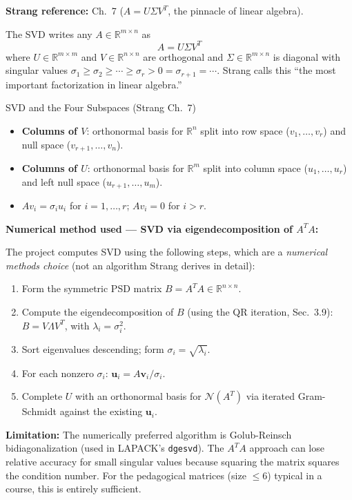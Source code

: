 \documentclass[12pt, a4paper]{article}
\newcommand{\R}{\mathbb{R}}
\newcommand{\Null}{\mathcal{N}}
\begin{document}
\textbf{Strang reference:} Ch.\ 7 ($A = U\Sigma V^T$, the pinnacle of linear
algebra).

The SVD writes any $A \in \R^{m \times n}$ as
\[
  A = U \Sigma V^T
\]
where $U \in \R^{m \times m}$ and $V \in \R^{n \times n}$ are orthogonal and
$\Sigma \in \R^{m \times n}$ is diagonal with singular values
$\sigma_1 \geq \sigma_2 \geq \cdots \geq \sigma_r > 0 = \sigma_{r+1} = \cdots$.
Strang calls this ``the most important factorization in linear algebra.''

\begin{strangbox}{SVD and the Four Subspaces (Strang Ch.\ 7)}
\begin{itemize}[noitemsep]
  \item \textbf{Columns of $V$}: orthonormal basis for $\R^n$ split into
        row space ($v_1,\ldots,v_r$) and null space ($v_{r+1},\ldots,v_n$).
  \item \textbf{Columns of $U$}: orthonormal basis for $\R^m$ split into
        column space ($u_1,\ldots,u_r$) and left null space ($u_{r+1},\ldots,u_m$).
  \item $A v_i = \sigma_i u_i$ for $i = 1,\ldots,r$; \quad $A v_i = 0$ for
        $i > r$.
\end{itemize}
\end{strangbox}

\noindent
\textbf{Numerical method used — SVD via eigendecomposition of $A^TA$:}

The project computes SVD using the following steps, which are a \emph{numerical
methods choice} (not an algorithm Strang derives in detail):
\begin{enumerate}[noitemsep]
  \item Form the symmetric PSD matrix $B = A^T A \in \R^{n \times n}$.
  \item Compute the eigendecomposition of $B$ (using the QR iteration,
        Sec.\ 3.9): $B = V \Lambda V^T$, with $\lambda_i = \sigma_i^2$.
  \item Sort eigenvalues descending; form $\sigma_i = \sqrt{\lambda_i}$.
  \item For each nonzero $\sigma_i$: $\mathbf{u}_i = A\mathbf{v}_i / \sigma_i$.
  \item Complete $U$ with an orthonormal basis for $\Null(A^T)$ via
        iterated Gram-Schmidt against the existing $\mathbf{u}_i$.
\end{enumerate}

\textbf{Limitation:} The numerically preferred algorithm is Golub-Reinsch
bidiagonalization (used in LAPACK's \texttt{dgesvd}).  The
$A^TA$ approach can lose relative accuracy for small singular values because
squaring the matrix squares the condition number.  For the pedagogical matrices
(size $\leq 6$) typical in a course, this is entirely sufficient.
\end{document}
